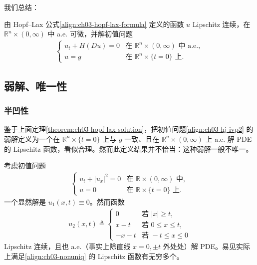 \documentclass[../../main.tex]{subfiles}
\begin{document}
我们总结：

\begin{theorem}\label{theorem:ch03-hopf-lax-solution}由 Hopf--Lax 公式\eqref{align:ch03-hopf-lax-formula} 定义的函数 $u$ Lipschitz 连续，在 $\mathbb{R}^n\times(0,\infty)$ 中 a.e. 可微，并解初值问题
\begin{align}\label{align:ch03-hj-aebvp}
\begin{cases}
u_t+H(Du)=0 & \text{在 }\mathbb{R}^n\times(0,\infty)\text{ 中 a.e.},\\
u=g & \text{在 }\mathbb{R}^n\times\{t=0\}\text{ 上}.
\end{cases}
\end{align}
\end{theorem}
\subsection{弱解、唯一性}\label{subsection:ch03-weak}

\subsubsection{半凹性}

鉴于上面定理\cref{theorem:ch03-hopf-lax-solution}，把初值问题\eqref{align:ch03-hj-ivp2} 的弱解定义为一个在 $\mathbb{R}^n\times\{t=0\}$ 上与 $g$ 一致、且在 $\mathbb{R}^n\times(0,\infty)$ 上 a.e. 解 PDE 的 Lipschitz 函数，看似合理。然而此定义结果并不恰当：这种弱解一般不唯一。

\begin{example}\label{example:ch03-nonuniq}
考虑初值问题
\begin{align}\label{align:ch03-nonuniq}
\begin{cases}
u_t+|u_x|^2=0 & \text{在 }\mathbb{R}\times(0,\infty)\text{ 中},\\
u=0 & \text{在 }\mathbb{R}\times\{t=0\}\text{ 上}.
\end{cases}
\end{align}
一个显然解是 $u_1(x,t)\equiv 0$。然而函数
\begin{align*}
u_2(x,t)\triangleq
\begin{cases}
0 & \text{若 }|x|\geqslant t,\\
x-t & \text{若 }0\leqslant x\leqslant t,\\
-x-t & \text{若 }-t\leqslant x\leqslant 0
\end{cases}
\end{align*}
Lipschitz 连续，且也 a.e.（事实上除直线 $x=0,\pm t$ 外处处）解 PDE。易见实际上满足\eqref{align:ch03-nonuniq} 的 Lipschitz 函数有无穷多个。
\end{example}
\end{document}
